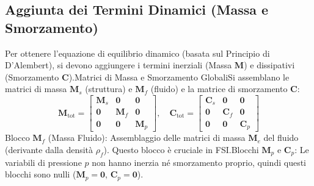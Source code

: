 \documentclass{article}
\begin{document}
\subsection{Aggiunta dei Termini Dinamici (Massa e Smorzamento)}
Per ottenere l'equazione di equilibrio dinamico (basata sul Principio di D'Alembert), si devono aggiungere i termini inerziali (Massa $\mathbf{M}$) e dissipativi (Smorzamento $\mathbf{C}$).Matrici di Massa e Smorzamento GlobaliSi assemblano le matrici di massa $\mathbf{M}_s$ (struttura) e $\mathbf{M}_f$ (fluido) e la matrice di smorzamento $\mathbf{C}$:$$\mathbf{M}_{\text{tot}} = \begin{bmatrix}
\mathbf{M}_{s} & \mathbf{0} & \mathbf{0} \\
\mathbf{0} & \mathbf{M}_{f} & \mathbf{0} \\
\mathbf{0} & \mathbf{0} & \mathbf{M}_{p}
\end{bmatrix}, \quad
\mathbf{C}_{\text{tot}} = \begin{bmatrix}
\mathbf{C}_{s} & \mathbf{0} & \mathbf{0} \\
\mathbf{0} & \mathbf{C}_{f} & \mathbf{0} \\
\mathbf{0} & \mathbf{0} & \mathbf{C}_{p}
\end{bmatrix}$$Blocco $\mathbf{M}_{f}$ (Massa Fluido): Assemblaggio delle matrici di massa $\mathbf{M}_e$ del fluido (derivante dalla densità $\rho_f$). Questo blocco è cruciale in FSI.Blocchi $\mathbf{M}_p$ e $\mathbf{C}_p$: Le variabili di pressione $p$ non hanno inerzia né smorzamento proprio, quindi questi blocchi sono nulli ($\mathbf{M}_p=\mathbf{0}$, $\mathbf{C}_p=\mathbf{0}$).
\end{document}
